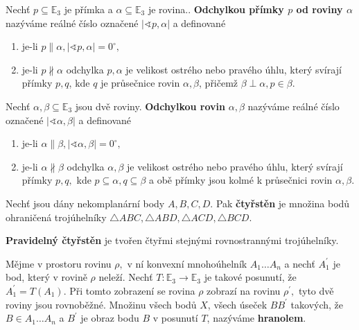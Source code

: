 \begin{definition}
    Nechť $p\subseteq \mathbb E_3$ je přímka a $\alpha\subseteq \mathbb E_3$ je
    rovina.. \textbf{Odchylkou přímky $p$ od roviny $\alpha$} nazýváme
    reálné číslo označené $|\sphericalangle
    p,\alpha|$ a definované
    \begin{enumerate}[$i.$]
    \item je-li $p\parallel \alpha, |\sphericalangle p,\alpha|=0^\circ,$
    \item je-li $p\nparallel \alpha$ odchylka $p,\alpha$ je velikost ostrého nebo
        pravého úhlu,
        který svírají přímky $p,q$, kde $q$ je průsečnice rovin $\alpha, \beta$,
        přičemž $\beta \perp \alpha, p\in\beta.$
    \end{enumerate}
\end{definition}

\begin{definition}
    Nechť $\alpha,\beta\subseteq \mathbb E_3$ jsou dvě roviny. \textbf{Odchylkou
    rovin} $\alpha, \beta$ nazýváme reálné číslo označené $|\sphericalangle
    \alpha, \beta|$ a definované
    \begin{enumerate}[$i.$]
    \item je-li $\alpha\parallel \beta, |\sphericalangle \alpha,\beta|=0^\circ,$
   	\item je-li $\alpha\nparallel \beta$ odchylka $\alpha,\beta$ je velikost
        ostrého nebo pravého úhlu,
        který svírají přímky $p,q,$ kde $p\subseteq \alpha, q\subseteq \beta$ a obě
        přímky jsou kolmé k průsečnici rovin $\alpha, \beta.$
    \end{enumerate}
\end{definition}

\begin{definition}
    Nechť jsou dány nekomplanární body $A,B,C,D.$ Pak
  \textbf{čtyřstěn} je množina bodů ohraničená trojúhelníky $\triangle ABC, \triangle
  ABD, \triangle ACD, \triangle BCD.$

  \textbf{Pravidelný čtyřstěn} je tvořen čtyřmi stejnými rovnostrannými trojúhelníky.
\end{definition}

\begin{definition}
    Mějme v prostoru rovinu $\rho,$ v ní konvexní mnohoúhelník $A_1\dots A_n$ a nechť
    $A_1^\prime$ je bod, který v rovině $\rho$ neleží. Nechť $T: \mathbb E_3 \to
    \mathbb E_3$ je takové posunutí, že $A_1^\prime=T(A_1).$ Při tomto zobrazení se rovina
    $\rho$ zobrazí na rovinu $\rho^\prime,$ tyto dvě roviny jsou rovnoběžné. Množinu všech
    bodů $X$, všech úseček $BB^\prime$ takových, že $B\in A_1\dots A_n$ a $B^\prime$ je
    obraz bodu $B$ v posunutí $T$, nazýváme \textbf{hranolem}.
\end{definition}

